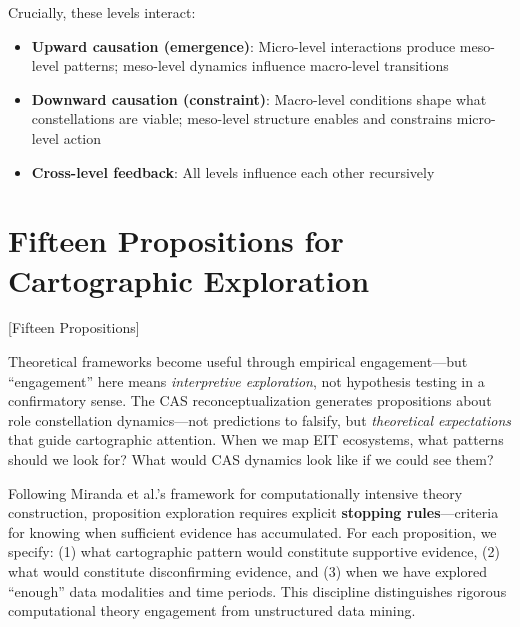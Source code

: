 \documentclass[../main.tex]{subfiles}
\begin{document}
Crucially, these levels interact:
\begin{itemize}[leftmargin=*, itemsep=0.2em]
\item \textbf{Upward causation (emergence)}: Micro-level interactions produce meso-level patterns; meso-level dynamics influence macro-level transitions
\item \textbf{Downward causation (constraint)}: Macro-level conditions shape what constellations are viable; meso-level structure enables and constrains micro-level action
\item \textbf{Cross-level feedback}: All levels influence each other recursively
\end{itemize}


\section{Fifteen Propositions for Cartographic Exploration}[Fifteen Propositions]

Theoretical frameworks become useful through empirical engagement---but ``engagement'' here means \textit{interpretive exploration}, not hypothesis testing in a confirmatory sense. The CAS reconceptualization generates propositions about role constellation dynamics---not predictions to falsify, but \textit{theoretical expectations} that guide cartographic attention. When we map EIT ecosystems, what patterns should we look for? What would CAS dynamics look like if we could see them?

Following Miranda et al.'s \cite{miranda2022computationally} framework for computationally intensive theory construction, proposition exploration requires explicit \textbf{stopping rules}---criteria for knowing when sufficient evidence has accumulated. For each proposition, we specify: (1) what cartographic pattern would constitute supportive evidence, (2) what would constitute disconfirming evidence, and (3) when we have explored ``enough'' data modalities and time periods. This discipline distinguishes rigorous computational theory engagement from unstructured data mining.
\end{document}
